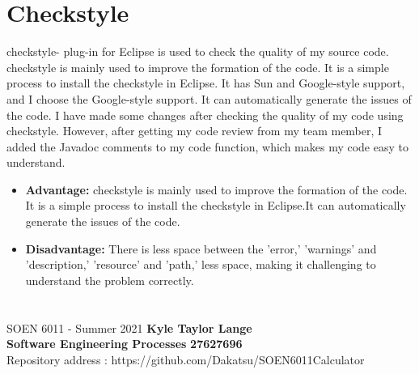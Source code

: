 \documentclass[letterpaper, 11pt]{report}
\begin{document}
\section*{Checkstyle} checkstyle- plug-in for Eclipse is used to check the quality of my source code. checkstyle is mainly used to improve the formation of the code. It is a simple process to install the checkstyle in Eclipse. It has Sun and Google-style support, and I choose the Google-style support. It can automatically generate the issues of the code. I have made some changes after checking the quality of my code using checkstyle. However, after getting my code review from my team member, I added the Javadoc comments to my code function, which makes my code easy to understand.
\begin{itemize}
\item \textbf{Advantage:} checkstyle is mainly used to improve the formation of the code. It is a simple process to install the checkstyle in Eclipse.It can automatically generate the issues of the code.
\item \textbf{Disadvantage:} There is less space between the 'error,' 'warnings'  and 'description,' 'resource' and 'path,' less space, making it challenging to understand the problem correctly.
\end{itemize}
\pagebreak

\section*{}
\normalsize {SOEN 6011 - Summer 2021} \hfill \textbf{Kyle Taylor Lange} \\
\textbf{ Software Engineering Processes}  \hfill \textbf{27627696} \\
\hfill Repository address : https://github.com/Dakatsu/SOEN6011Calculator
\end{document}
